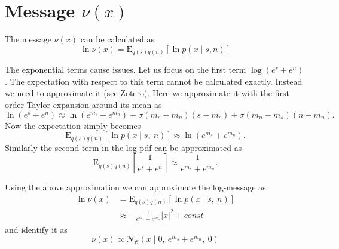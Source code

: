 \section{Message $\nu(x)$}

The message $\nu(x)$ can be calculated as
\begin{equation}
    \ln \nu(x) = \mathrm{E}_{q(s)q(n)}\left[\ln p(x\mid s, n)\right]
\end{equation}

The exponential terms cause issues. Let us focus on the first term $\log(e^s + e^n)$. The expectation with respect to this term cannot be calculated exactly. Instead we need to approximate it (see Zotero). Here we approximate it with the first-order Taylor expansion around its mean as
\begin{equation}
    \ln(e^s+e^n) \approx \ln(e^{m_s} + e^{m_n}) + \sigma(m_s - m_n) (s-m_s) + \sigma(m_n - m_s)(n-m_n).
\end{equation}
Now the expectation simply becomes 
\begin{equation}
    \mathrm{E}_{q(s)q(n)} \left[\ln p(x\mid s,\ n)\right] \approx \ln (e^{m_s} + e^{m_n}).
\end{equation}
Similarly the second term in the log-pdf can be approximated as 
\begin{equation}
    \mathrm{E}_{q(s)q(n)} \left[ \frac{1}{e^s + e^n}\right] \approx \frac{1}{e^{m_s} + e^{m_n}}.
\end{equation} 

Using the above approximation we can approximate the log-message as
\begin{equation}
    \begin{split}
        \ln \nu(x) 
        &= \mathrm{E}_{q(s)q(n)}\left[\ln p(x\mid s,\ n)\right] \\
        &\approx -\frac{1}{e^{m_s} + e^{m_n}} |x|^2 + \textit{const}
    \end{split}
\end{equation}
and identify it as 
\begin{equation}
    \boxed{
        \nu(x) \propto \mathcal{N}_\mathcal{C}(x \mid 0,\ e^{m_s} + e^{m_n},\ 0)
    }
\end{equation}